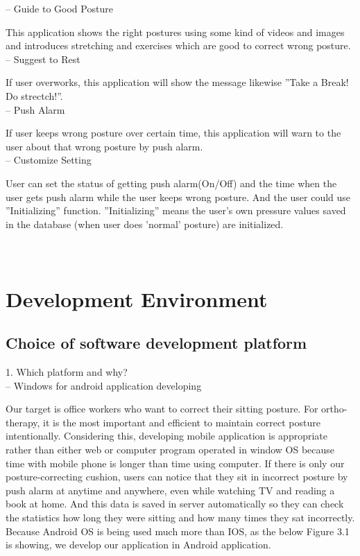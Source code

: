 \documentclass[conference]{IEEEtran}
\begin{document}
-- Guide to Good Posture

This application shows the right postures using some kind of videos and images and introduces stretching and exercises which are good to correct wrong posture.\\

-- Suggest to Rest

If user overworks, this application will show the message likewise ''Take a Break! Do strectch!''.\\

-- Push Alarm

If user keeps wrong posture over certain time, this application will warn to the user about that wrong posture by push alarm.\\

-- Customize Setting

User can set the status of getting push alarm(On/Off) and the time when the user gets push alarm while the user keeps wrong posture. And the user could use ''Initializing'' function. ''Initializing'' means the user's own pressure values saved in the database (when user does 'normal' posture) are initialized.\\\\\\


\section{Development Environment}

\subsection{Choice of software development platform}

1. Which platform and why?  \\

-- Windows for android application developing

Our target is office workers who want to correct their sitting posture. For ortho-therapy, it is the most important and efficient to maintain correct posture intentionally. Considering this, developing mobile application is appropriate rather than either web or computer program operated in window OS because time with mobile phone is longer than time using computer. If there is only our posture-correcting cushion, users can notice that they sit in incorrect posture by push alarm at anytime and anywhere, even while watching TV and reading a book at home. And this data is saved in server automatically so they can check the statistics how long they were sitting and how many times they sat incorrectly. Because Android OS is being used much more than IOS, as the below Figure 3.1 is showing, we develop our application in Android application.
\end{document}
